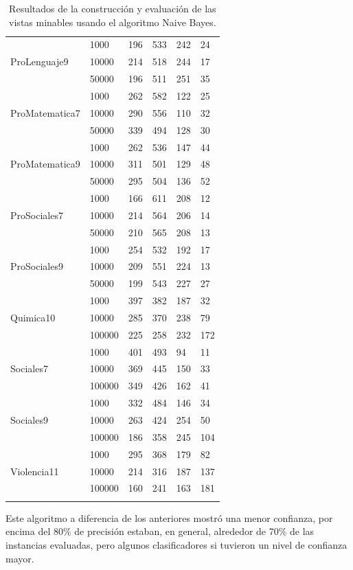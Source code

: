 \begin{longtable}{|p{3cm}|p{3cm}|p{2cm}|p{2cm}|p{2cm}|p{2cm}|}
\hline
\multirow{3}[6]{*}{ProLenguaje9} & 1000  & 196   & 533   & 242   & 24 \\
\cline{2-6}      & 10000 & 214   & 518   & 244   & 17 \\
\cline{2-6}      & 50000 & 196   & 511   & 251   & 35 \\
\hline
\multirow{3}[6]{*}{ProMatematica7} & 1000  & 262   & 582   & 122   & 25 \\
\cline{2-6}      & 10000 & 290   & 556   & 110   & 32 \\
\cline{2-6}      & 50000 & 339   & 494   & 128   & 30 \\
\hline
\multirow{3}[6]{*}{ProMatematica9} & 1000  & 262   & 536   & 147   & 44 \\
\cline{2-6}      & 10000 & 311   & 501   & 129   & 48 \\
\cline{2-6}      & 50000 & 295   & 504   & 136   & 52 \\
\hline
\multirow{3}[6]{*}{ProSociales7} & 1000  & 166   & 611   & 208   & 12 \\
\cline{2-6}      & 10000 & 214   & 564   & 206   & 14 \\
\cline{2-6}      & 50000 & 210   & 565   & 208   & 13 \\
\hline
\multirow{3}[6]{*}{ProSociales9} & 1000  & 254   & 532   & 192   & 17 \\
\cline{2-6}      & 10000 & 209   & 551   & 224   & 13 \\
\cline{2-6}      & 50000 & 199   & 543   & 227   & 27 \\
\hline
\multirow{3}[6]{*}{Quimica10} & 1000  & 397   & 382   & 187   & 32 \\
\cline{2-6}      & 10000 & 285   & 370   & 238   & 79 \\
\cline{2-6}      & 100000 & 225   & 258   & 232   & 172 \\
\hline
\multirow{3}[6]{*}{Sociales7} & 1000  & 401   & 493   & 94    & 11 \\
\cline{2-6}      & 10000 & 369   & 445   & 150   & 33 \\
\cline{2-6}      & 100000 & 349   & 426   & 162   & 41 \\
\hline
\multirow{3}[6]{*}{Sociales9} & 1000  & 332   & 484   & 146   & 34 \\
\cline{2-6}      & 10000 & 263   & 424   & 254   & 50 \\
\cline{2-6}      & 100000 & 186   & 358   & 245   & 104 \\
\hline
\multirow{3}[6]{*}{Violencia11} & 1000  & 295   & 368   & 179   & 82 \\
\cline{2-6}      & 10000 & 214   & 316   & 187   & 137 \\
\cline{2-6}      & 100000 & 160   & 241   & 163   & 181 \\
\hline
\caption{Resultados de la construcción y evaluación de las vistas minables usando el algoritmo Naive Bayes.}
\label{tab:cuadro36}
\end{longtable}
Este algoritmo a diferencia de los anteriores mostró una menor confianza, por encima del 80\% de precisión estaban, en general, alrededor de 70\% de las instancias evaluadas, pero algunos clasificadores si tuvieron un nivel de confianza mayor.

